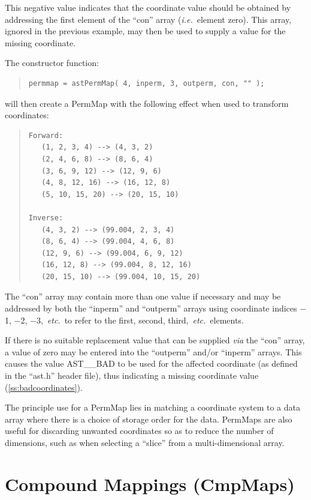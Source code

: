 \documentclass[twoside,11pt]{article}
\newcommand{\secref}[1]{\S\ref{#1}}
\renewcommand{\secref}[1]{\ref{#1}}
\begin{document}
This negative value indicates that the coordinate value should be
obtained by addressing the first element of the ``con'' array
({\em{i.e.}}\ element zero). This array, ignored in the previous
example, may then be used to supply a value for the missing
coordinate.

The constructor function:

\begin{quote}
\small
\begin{verbatim}
permmap = astPermMap( 4, inperm, 3, outperm, con, "" );
\end{verbatim}
\normalsize
\end{quote}

will then create a PermMap with the following effect when used to
transform coordinates:

\begin{quote}
\begin{verbatim}
Forward:
   (1, 2, 3, 4) --> (4, 3, 2)
   (2, 4, 6, 8) --> (8, 6, 4)
   (3, 6, 9, 12) --> (12, 9, 6)
   (4, 8, 12, 16) --> (16, 12, 8)
   (5, 10, 15, 20) --> (20, 15, 10)

Inverse:
   (4, 3, 2) --> (99.004, 2, 3, 4)
   (8, 6, 4) --> (99.004, 4, 6, 8)
   (12, 9, 6) --> (99.004, 6, 9, 12)
   (16, 12, 8) --> (99.004, 8, 12, 16)
   (20, 15, 10) --> (99.004, 10, 15, 20)
\end{verbatim}
\end{quote}

The ``con'' array may contain more than one value if necessary and may
be addressed by both the ``inperm'' and ``outperm'' arrays using
coordinate indices $-$1, $-$2, $-$3,~{\em{etc.}}\ to refer to the
first, second, third,~{\em{etc.}}\ elements.

If there is no suitable replacement value that can be supplied
{\em{via}} the ``con'' array, a value of zero may be entered into the
``outperm'' and/or ``inperm'' arrays. This causes the value AST\_\_BAD
to be used for the affected coordinate (as defined in the ``ast.h''
header file), thus indicating a missing coordinate value
(\secref{ss:badcoordinates}).

The principle use for a PermMap lies in matching a coordinate system
to a data array where there is a choice of storage order for the data.
PermMaps are also useful for discarding unwanted coordinates so as to
reduce the number of dimensions, such as when selecting a ``slice''
from a multi-dimensional array.

\cleardoublepage
\section{\label{ss:cmpmaps}Compound Mappings (CmpMaps)}
\end{document}
